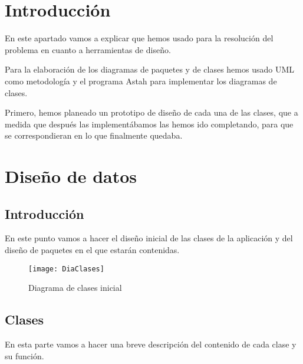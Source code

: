 
\section{Introducción}

En este apartado vamos a explicar que hemos usado para la resolución del problema en cuanto a herramientas de diseño.

Para la elaboración de los diagramas de paquetes y de clases hemos usado UML como metodología y el programa Astah para implementar los diagramas de clases.

Primero, hemos planeado un prototipo de diseño de cada una de las clases, que a medida que después las implementábamos las hemos ido completando, para que se correspondieran en lo que finalmente quedaba.



\section{Diseño de datos}

\subsection{Introducción}
En este punto vamos a hacer el diseño inicial de las clases de la aplicación y del diseño de paquetes en el que estarán contenidas.

\begin{figure}[h]
	\centering
	\texttt{[image: DiaClases]}
	\caption{Diagrama de clases inicial}
	\label{fig:C.1.1}
\end{figure}
 


\subsection{Clases}
En esta parte vamos a hacer una breve descripción del contenido de cada clase y su función.

